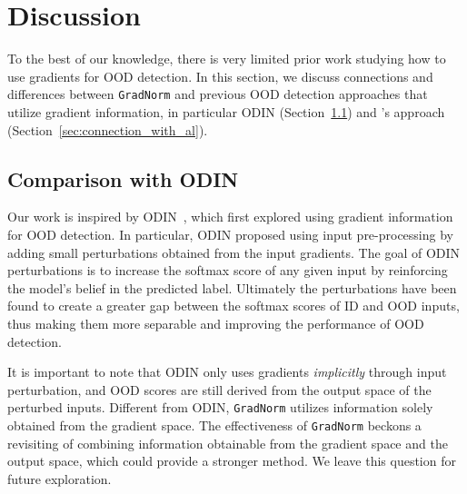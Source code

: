 \documentclass{article}
\begin{document}
\vspace{-0.2cm}
\section{Discussion}
\label{sec:discussion}
\vspace{-0.2cm}
To the best of our knowledge, there is very limited prior work studying how to use gradients for OOD detection.  In this section, we discuss connections and differences between \texttt{GradNorm} and previous OOD detection approaches that utilize gradient information, in particular ODIN (Section~\ref{sec:connection_with_odin}) and \citeauthor{lee2020gradients}'s approach (Section~\ref{sec:connection_with_al}).



\vspace{-0.2cm}
\subsection{Comparison with ODIN}
\label{sec:connection_with_odin}
\vspace{-0.1cm}

Our work is inspired by ODIN~\cite{liang2018enhancing}, which first explored using gradient information for OOD detection. In particular, ODIN proposed using input pre-processing by adding small perturbations obtained from the input gradients. The goal of ODIN perturbations is to increase the softmax score of any given input by reinforcing the model's belief in the predicted label. Ultimately the perturbations have been found to create a greater gap between the softmax scores of ID and OOD inputs, thus making them more separable and improving the performance of OOD detection.

It is important to note that ODIN only uses gradients \emph{implicitly} through input perturbation, and OOD scores are still derived from the output space of the perturbed inputs. Different from ODIN, \texttt{GradNorm} utilizes information solely obtained from the {gradient space}. The effectiveness of \texttt{GradNorm} beckons a revisiting of combining information obtainable from the gradient space and the output space, which could provide a stronger method. We leave this question for future exploration.
\end{document}
